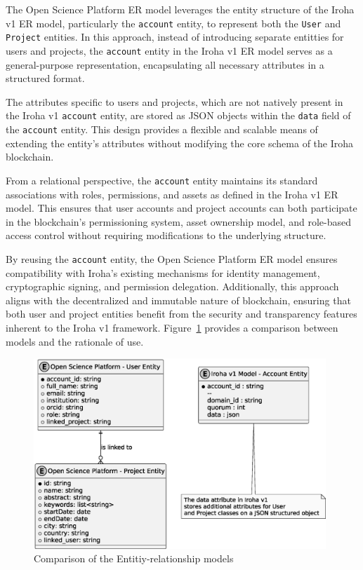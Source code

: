 \documentclass[final]{rc-book-2.14}
\begin{document}
The Open Science Platform ER model leverages the entity structure of the Iroha v1 ER model, particularly the \texttt{account} entity, to represent both the \texttt{User} and \texttt{Project} entities. In this approach, instead of introducing separate entitties for users and projects, the \texttt{account} entity in the Iroha v1 ER model serves as a general-purpose representation, encapsulating all necessary attributes in a structured format.

The attributes specific to users and projects, which are not natively present in the Iroha v1 \texttt{account} entity, are stored as JSON objects within the \texttt{data} field of the \texttt{account} entity. This design provides a flexible and scalable means of extending the entity's attributes without modifying the core schema of the Iroha blockchain.

From a relational perspective, the \texttt{account} entity maintains its standard associations with roles, permissions, and assets as defined in the Iroha v1 ER model. This ensures that user accounts and project accounts can both participate in the blockchain's permissioning system, asset ownership model, and role-based access control without requiring modifications to the underlying structure.

By reusing the \texttt{account} entity, the Open Science Platform ER model ensures compatibility with Iroha's existing mechanisms for identity management, cryptographic signing, and permission delegation. Additionally, this approach aligns with the decentralized and immutable nature of blockchain, ensuring that both user and project entities benefit from the security and transparency features inherent to the Iroha v1 framework. Figure~\ref{fig:comparing_er_models} provides a comparison between models and the rationale of use.



\begin{figure}[htbp]
    \centering
    \includegraphics[width=0.98\textwidth, keepaspectratio]{fig/comparing_er_models.eps}
    \caption{Comparison of the Entitiy-relationship models}
    \label{fig:comparing_er_models}
\end{figure}
\end{document}
